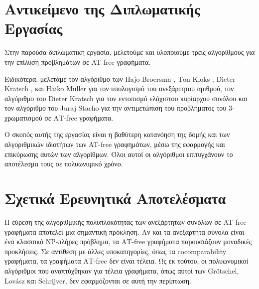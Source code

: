 \section{Αντικείμενο της Διπλωματικής Εργασίας}
\label{sec:Thesis_Subject}

Στην παρούσα διπλωματική εργασία, μελετούμε  και υλοποιούμε τρεις αλγορίθμους για την επίλυση προβλημάτων σε AT-free γραφήματα.

Ειδικότερα, μελετάμε τον αλγόριθμο των Ηajo Βroersma , Τon Κloks , Dieter Kratsch , και Ηaiko Μüller\cite{at-free-independent-sets} για τον υπολογισμό του ανεξάρτητου αριθμού, τον αλγόριθμο του Dieter Kratsch\cite{at-free-domination} για τον εντοπισμό ελάχιστου κυρίαρχου συνόλου και τον αλγόριθμο του Juraj Stacho\cite{at-free-3-colouring}  για την αντιμετώπιση του προβλήματος του 3-χρωματισμού σε ΑΤ-free γραφήματα. 

Ο σκοπός αυτής της εργασίας είναι η βαθύτερη κατανόηση της δομής και των αλγοριθμικών ιδιοτήτων των AT-free γραφημάτων, μέσω της εφαρμογής και επικύρωσης αυτών των αλγορίθμων. Όλοι αυτοί οι αλγόριθμοι επιτυγχάνουν το αποτέλεσμα τους σε πολυωνυμικό χρόνο. 


\section{Σχετικά Ερευνητικά Αποτελέσματα}
\label{sec:Similar_results}

Η εύρεση της αλγοριθμικής πολυπλοκότητας των ανεξάρτητων συνόλων σε AT-free γραφήματα  αποτελεί μια σημαντική πρόκληση. Αν και τα ανεξάρτητα σύνολα είναι ένα κλασσικό NP-πλήρες πρόβλημα, τα ΑΤ-free γραφήματα παρουσιάζουν μοναδικές προκλήσεις. Σε αντίθεση με άλλες υποκατηγορίες, όπως τα cocomparability γραφήματα, τα γραφήματα ΑΤ-free δεν είναι τέλεια. Ως εκ τούτου, οι πολυωνυμικοί αλγόριθμοι που αναπτύχθηκαν για τέλεια γραφήματα, όπως αυτοί των Grötschel, Lovász και Schrijver\cite{tolerance-graphs-recognition}, δεν εφαρμόζονται σε αυτή την περίπτωση.

